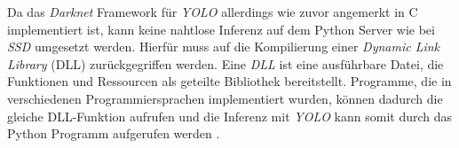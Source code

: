 Da das \textit{Darknet} Framework für \textit{YOLO} allerdings wie zuvor angemerkt in C implementiert ist, kann keine nahtlose Inferenz auf dem Python Server wie bei \textit{SSD} umgesetzt werden. Hierfür muss auf die Kompilierung einer \textit{Dynamic Link Library} (DLL) zurückgegriffen werden. Eine \textit{DLL} ist eine ausführbare Datei, die Funktionen und Ressourcen als geteilte Bibliothek bereitstellt. Programme, die in verschiedenen Programmiersprachen implementiert wurden, können dadurch die gleiche DLL-Funktion aufrufen und die Inferenz mit \textit{YOLO} kann somit durch das Python Programm aufgerufen werden \cite{MicrosoftCorporation.27.01.2020}.
